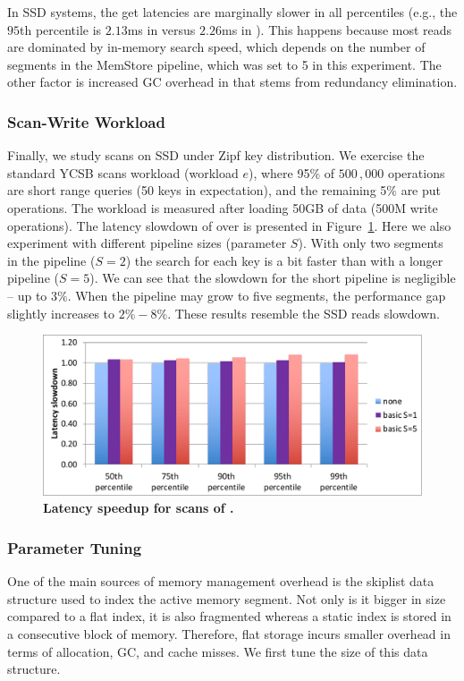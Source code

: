 In SSD systems, the get latencies are marginally slower in all percentiles (e.g., the 
$95$th percentile is $2.13$ms in \none\/ versus $2.26$ms in \adp). This happens
because most reads are dominated by in-memory search speed, which depends on the 
number of segments in the MemStore pipeline, which was set to 5 in this experiment. 
The other factor
is increased GC overhead in \adp\/ that stems from redundancy elimination. 


\subsubsection{Scan-Write Workload}
Finally, we study  scans  on SSD under Zipf key distribution. We exercise  the standard YCSB scans workload (workload $e$), where 95\% of $500\,,000$ operations are short range queries (50 keys in expectation), and the remaining 5\% are put operations.  The workload is measured after loading 50GB of data (500M write operations). The latency slowdown of \basic\/ over \none\/ is presented in Figure~\ref{fig:scans}. Here we also experiment with different pipeline sizes (parameter $S$). With only two segments in the pipeline ($S=2$) the search for each key is a bit faster than with a longer pipeline ($S=5$). We can see that the slowdown for the short pipeline is negligible -- up to $3\%$. When the pipeline may grow to five segments, the performance gap slightly increases to $2\%-8\%$. These results resemble the SSD reads slowdown.

\begin{figure}[htb]
\includegraphics[width=\figw]{Figs/scans.pdf}
\caption{\textbf{Latency speedup for scans of \basic.
}}
\label{fig:scans}
\end{figure}



\subsubsection{Parameter Tuning} \label{ssec:tuning}
One of the main sources of memory management overhead is the skiplist data structure used to index the active  memory segment.
Not only  is it bigger in size compared to a flat index, it is also fragmented whereas a static index is stored in a consecutive block of memory. Therefore, flat storage incurs smaller overhead in terms of allocation, GC, and cache misses.
We first tune the size of this data structure.

